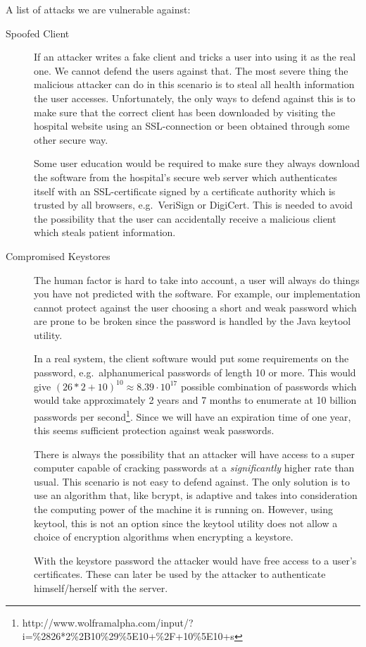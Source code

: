 \documentclass[10pt, a4paper]{article}
\begin{document}
A list of attacks we are vulnerable against:
\begin{description}
\item[Spoofed Client] If an attacker writes a fake client and tricks a user into using it as the real one. We cannot defend the users against that. The most severe thing the malicious attacker can do in this scenario is to steal all health information the user accesses. Unfortunately, the only ways to defend against this is to make sure that the correct client has been downloaded by visiting the hospital website using an SSL-connection or been obtained through some other secure way.

Some user education would be required to make sure they always download the software from the hospital's secure web server which authenticates itself with an SSL-certificate signed by a certificate authority which is trusted by all browsers, e.g.~VeriSign or DigiCert. This is needed to avoid the possibility that the user can accidentally receive a malicious client which steals patient information.

\item[Compromised Keystores]The human factor is hard to take into account, a user will always do things you have not predicted with the software. For example, our implementation cannot protect against the user choosing a short and weak password which are prone to be broken since the password is handled by the Java keytool utility.

In a real system, the client software would put some requirements on the password, e.g.~alphanumerical passwords of length 10 or more. This would give $(26*2 + 10)^{10} \approx 8.39\cdot 10^{17}$ possible combination of passwords which would take approximately 2 years and 7 months to enumerate at 10 billion passwords per second\footnote{http://www.wolframalpha.com/input/?i=\%2826*2\%2B10\%29\%5E10+\%2F+10\%5E10+s}. Since we will have an expiration time of one year, this seems sufficient protection against weak passwords.

There is always the possibility that an attacker will have access to a super computer capable of cracking passwords at a \emph{significantly} higher rate than usual. This scenario is not easy to defend against. The only solution is to use an algorithm that, like bcrypt, is adaptive and takes into consideration the computing power of the machine it is running on. However, using keytool, this is not an option since the keytool utility does not allow a choice of encryption algorithms when encrypting a keystore.

With the keystore password the attacker would have free access to a user's certificates. These can later be used by the attacker to authenticate himself/herself with the server.

\end{description}
\end{document}
